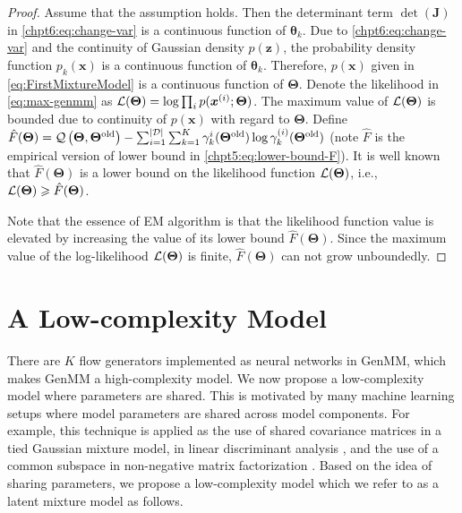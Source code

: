 \begin{proof}
  Assume that the assumption holds. Then the determinant term $\det(\bm{J})$ in \eqref{chpt6:eq:change-var} is a continuous function of $\bm{\theta}_k$. Due to \eqref{chpt6:eq:change-var} and the continuity of Gaussian density $p(\bm{z})$, the probability density function $p_k(\bm{x})$ is a continuous function of $\bm{\theta}_k$. Therefore, $p(\bm{x})$ given in \eqref{eq:FirstMixtureModel} is a continuous function of $\bm{\Theta}$. Denote the likelihood in \eqref{eq:max-genmm} as $\mathcal{L}(\bm{\Theta})=\log \textstyle\prod_{i} p(\bm{x}^{(i)};\bm{\Theta})$. The maximum value of $\mathcal{L}(\bm{\Theta})$ is bounded due to continuity of $p(\bm{x})$ with regard to $\bm{\Theta}$.
  Define $\hat{F}(\bm{\Theta}) = \mathcal{Q}\left(\bm{\Theta},\bm{\Theta}^{\mathrm{old}}\right) - \sum_{i=1}^{| \mathcal{D} |}\sum_{k=1}^{K}\gamma_k^{i}(\bm{\Theta}^{\mathrm{old}}) \log\gamma_k^{(i)}(\bm{\Theta}^{\mathrm{old}})$ (note $\hat{F}$ is the empirical version of lower bound in \eqref{chpt5:eq:lower-bound-F}). It is well known that $\hat{F}(\bm{\Theta})$ is a lower bound on the likelihood function $\mathcal{L}(\bm{\Theta})$, i.e., $\mathcal{L}(\bm{\Theta}) \geqslant \hat{F}(\bm{\Theta})$.

  Note that the essence of EM algorithm is that the likelihood function value is elevated by increasing the value of its lower bound $\hat{F}(\bm{\Theta})$. Since the maximum value of the log-likelihood $\mathcal{L}(\bm{\Theta})$ is finite, $\hat{F}(\bm{\Theta})$ can not grow unboundedly.

\end{proof}


\section{A Low-complexity Model}
There are $K$ flow generators implemented as neural networks in GenMM, which makes GenMM a high-complexity model.
We now propose a low-complexity model where parameters are shared. This is motivated by many machine learning setups where model parameters are shared across model components. For example, this technique is applied as the use of shared covariance matrices in a tied Gaussian mixture model, in linear discriminant analysis \cite{bellegarda1990tiedmixture, Kimball:1993:UTD:1075671.1075694, Bishop:2006:PRM:1162264}, and the use of a common subspace in non-negative matrix factorization \cite{Gupta2013}. Based on the idea of sharing parameters, we propose a low-complexity model which we refer to as a latent mixture model as follows.

